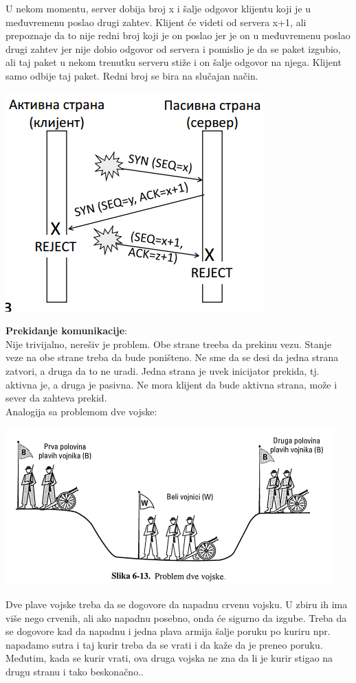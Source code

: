 \documentclass{article} %
\begin{document}
U nekom momentu, server dobija broj x i šalje odgovor klijentu koji je u međuvremenu poslao drugi zahtev. Klijent će videti od servera x+1, ali prepoznaje da to nije redni broj koji je on poslao jer je on u međuvremenu poslao drugi zahtev jer nije dobio odgovor od servera i pomislio je da se paket izgubio, ali taj paket u nekom trenutku serveru stiže i on šalje odgovor na njega.  Klijent samo odbije taj paket. Redni broj se bira na slučajan način.
\begin{center}
	\includegraphics[scale=0.5]{veza3}
\end{center}
\textbf{Prekidanje komunikacije}:\\
Nije trivijalno, nerešiv je problem. Obe strane treeba da prekinu vezu. Stanje veze na obe strane treba da bude poništeno. Ne sme da se desi da jedna strana zatvori, a druga da to ne uradi. Jedna strana je uvek inicijator prekida, tj. aktivna je, a druga je pasivna. Ne mora klijent da bude aktivna strana, može i sever da zahteva prekid.\\
Analogija sa problemom dve vojske:\\
\begin{center}
	\includegraphics[scale=0.7]{veze4}
\end{center}
Dve plave vojske treba da se dogovore da napadnu crvenu vojsku. U zbiru ih ima više nego crvenih, ali ako napadnu posebno, onda će sigurno da izgube. Treba da se dogovore kad da napadnu i jedna plava armija šalje poruku po kuriru npr. napadamo sutra i taj kurir treba da se vrati i da kaže da je preneo poruku. Međutim, kada se kurir vrati, ova druga vojska ne zna da li je kurir stigao na drugu stranu i tako beskonačno..\\
\end{document}
